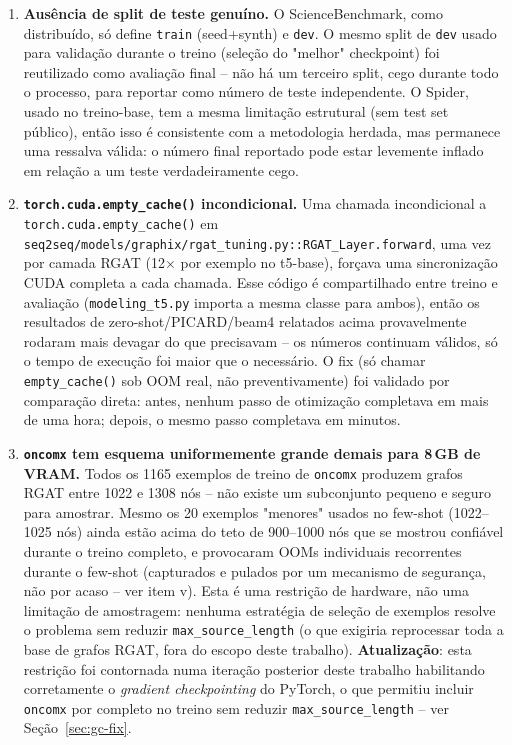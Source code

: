 \begin{enumerate}
\item[(i)] \textbf{Ausência de split de teste genuíno.} O ScienceBenchmark,
como distribuído, só define \texttt{train} (seed+synth) e \texttt{dev}. O
mesmo split de \texttt{dev} usado para validação durante o treino
(seleção do "melhor" checkpoint) foi reutilizado como avaliação final --
não há um terceiro split, cego durante todo o processo, para reportar como
número de teste independente. O Spider, usado no treino-base, tem a mesma
limitação estrutural (sem test set público), então isso é consistente com
a metodologia herdada, mas permanece uma ressalva válida: o número final
reportado pode estar levemente inflado em relação a um teste verdadeiramente
cego.

\item[(ii)] \textbf{\texttt{torch.cuda.empty\_cache()} incondicional.} Uma
chamada incondicional a \texttt{torch.cuda.empty\_cache()} em
\texttt{seq2seq/models/graphix/rgat\_tuning.py::RGAT\_Layer.forward}, uma
vez por camada RGAT (12$\times$ por exemplo no t5-base), forçava uma
sincronização CUDA completa a cada chamada. Esse código é compartilhado
entre treino e avaliação (\texttt{modeling\_t5.py} importa a mesma classe
para ambos), então os resultados de zero-shot/PICARD/beam4 relatados acima
provavelmente rodaram mais devagar do que precisavam -- os números
continuam válidos, só o tempo de execução foi maior que o necessário. O
fix (só chamar \texttt{empty\_cache()} sob OOM real, não preventivamente)
foi validado por comparação direta: antes, nenhum passo de otimização
completava em mais de uma hora; depois, o mesmo passo completava em
minutos.

\item[(iii)] \textbf{\texttt{oncomx} tem esquema uniformemente grande
demais para 8\,GB de VRAM.} Todos os 1165 exemplos de treino de
\texttt{oncomx} produzem grafos RGAT entre 1022 e 1308 nós -- não existe
um subconjunto pequeno e seguro para amostrar. Mesmo os 20 exemplos
"menores" usados no few-shot (1022--1025 nós) ainda estão acima do teto de
900--1000 nós que se mostrou confiável durante o treino completo, e
provocaram OOMs individuais recorrentes durante o few-shot (capturados e
pulados por um mecanismo de segurança, não por acaso -- ver item v). Esta é
uma restrição de hardware, não uma limitação de amostragem: nenhuma
estratégia de seleção de exemplos resolve o problema sem reduzir
\texttt{max\_source\_length} (o que exigiria reprocessar toda a base de
grafos RGAT, fora do escopo deste trabalho). \textbf{Atualização}: esta
restrição foi contornada numa iteração posterior deste trabalho habilitando
corretamente o \emph{gradient checkpointing} do PyTorch, o que permitiu
incluir \texttt{oncomx} por completo no treino sem reduzir
\texttt{max\_source\_length} -- ver Seção~\ref{sec:gc-fix}.


\end{enumerate}
